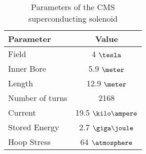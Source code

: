 \begin{table}[!htb]
  \centering
  \begin{tabular}{|l|c|}
  \hline
  Parameter & Value \\
  \hline\hline
  Field           & 4     $\tesla$ \\
  Inner Bore      & 5.9   $\meter$ \\
  Length          & 12.9  $\meter$ \\
  Number of turns & 2168           \\
  Current         & 19.5  $\kilo\ampere$ \\
  Stored Energy   & 2.7   $\giga\joule$  \\
  Hoop Stress     & 64    $\atmosphere$ \\
  \hline
  \end{tabular}
  \caption[Parameters of the CMS superconducting solenoid]{Parameters of the CMS superconducting solenoid}
  \label{TABLE:ExperimentalApparatus_CMSMagnetParameters}
\end{table}
